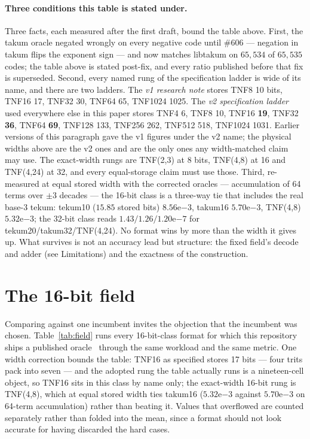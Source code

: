 \paragraph{Three conditions this table is stated under.} Three
facts, each measured after the first draft, bound the table above. First, the
takum oracle negated wrongly on every negative code until \#606 --- negation
in takum flips the exponent sign --- and now matches libtakum on $65{,}534$ of
$65{,}535$ codes; the table above is stated post-fix, and every ratio published
before that fix is superseded. Second, every named rung of the specification
ladder is wide of its name, and there are two ladders. The \emph{v1 research
note} stores TNF8 10 bits, TNF16 17, TNF32 30, TNF64 65, TNF1024 1025. The
\emph{v2 specification ladder} used everywhere else in this paper stores
TNF4 6, TNF8 10, TNF16 \textbf{19}, TNF32 \textbf{36}, TNF64 \textbf{69},
TNF128 133, TNF256 262, TNF512 518, TNF1024 1031. Earlier versions of this
paragraph gave the v1 figures under the v2 name; the physical widths above are
the v2 ones and are the only ones any width-matched claim may use. The
exact-width rungs are TNF(2,3) at 8 bits, TNF(4,8) at 16 and TNF(4,24) at 32,
and every equal-storage claim must use those. Third, re-measured at equal stored width
with the corrected oracles --- accumulation of 64 terms over $\pm3$ decades
--- the 16-bit class is a three-way tie that includes the real base-3 tekum:
tekum10 ($15.85$ stored bits) $8.56\mathrm{e}{-3}$, takum16
$5.70\mathrm{e}{-3}$, TNF(4,8) $5.32\mathrm{e}{-3}$; the 32-bit class reads
$1.43/1.26/1.20\mathrm{e}{-7}$ for tekum20/takum32/TNF(4,24). No format wins
by more than the width it gives up. What survives is not an accuracy lead but
structure: the fixed field's decode and adder (see Limitations) and the
exactness of the construction.

\section{The 16-bit field}\label{sec:field}



Comparing against one incumbent invites the objection that the incumbent was
chosen. Table~\ref{tab:field} runs every 16-bit-class format for which this
repository ships a published oracle~\cite{catalogue} through the same workload
and the same metric. One width correction bounds the table: TNF16 as specified
stores 17 bits --- four trits pack into seven --- and the adopted rung the
table actually runs is a nineteen-cell object, so TNF16 sits in this class by
name only; the exact-width 16-bit rung is TNF(4,8), which at equal stored
width ties takum16 ($5.32\mathrm{e}{-3}$ against $5.70\mathrm{e}{-3}$ on
64-term accumulation) rather than beating it. Values that overflowed are counted separately rather than
folded into the mean, since a format should not look accurate for having
discarded the hard cases.

